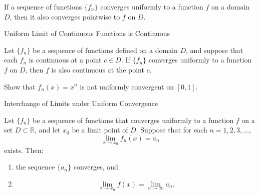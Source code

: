 \documentclass[12pt, a4paper]{article}
\begin{document}
\vspace{10pt}

\begin{theorem}
    If a sequence of functions $\{f_n\}$ converges uniformly to a function $f$ on a domain $D$, then it also converges pointwise to $f$ on $D$.
\end{theorem}

\clearpage

\begin{heading}
    Uniform Limit of Continuous Functions is Continuous
\end{heading}

\vspace{10pt}

\begin{theorem}
    Let $\{f_n\}$ be a sequence of functions defined on a domain $D$, and suppose that each $f_n$ is continuous at a point $c \in D$. If $\{f_n\}$ converges uniformly to a function $f$ on $D$, then $f$ is also continuous at the point $c$.
\end{theorem}

\clearpage

\begin{problem}
    Show that $f_n(x)=x^n$ is not uniformly convergent on $[0, 1]$. 
\end{problem}

\clearpage

\begin{heading}
    Interchange of Limits under Uniform Convergence
\end{heading}

\vspace{10pt}

\begin{theorem}
Let $\{f_n\}$ be a sequence of functions that converges uniformly to a function
$f$ on a set $D\subset\mathbb{R}$, and let $x_0$ be a limit point of $D$.
Suppose that for each $n=1,2,3,\dots$,
\[
\lim_{x\to x_0} f_n(x) = a_n
\]
exists. Then:
\begin{enumerate}
\item the sequence $\{a_n\}$ converges, and
\item 
\[
\lim_{x\to x_0} f(x) = \lim_{n\to\infty} a_n.
\]
\end{enumerate}
\end{theorem}

\clearpage
\end{document}
